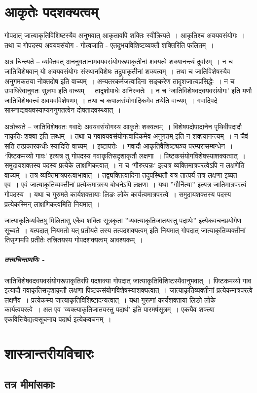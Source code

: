 \section{आकृतेः पदशक्यत्वम्} 
	
		गोपदात् जात्याकृतिविशिष्टस्यैव अनुभवात् आकृतावपि शक्तिः स्वीक्रियते~। आकृतिश्च अवयवसंयोगः~।  तथा च गोपदस्य अवयवसंयोग - गोत्वजाति - एतदुभयविशिष्टव्यक्तौ शक्तिरिति फलितम्~।
		
		अत्र चिन्त्यते – व्यक्तिवत् अननुगतानामवयवसंयोगरूपाकृतीनां शक्यत्वे शक्यानन्त्यं दुर्वारम्~। न च जातिविशेषवान् यो अवयवसंयोगः संस्थानविशेषः तद्रूपाकृतीनां शक्यत्वम्~। तथा च जातिविशेषस्यैव अनुगमकतया नोक्तदोष इति वाच्यम्~। अन्यतरकर्मजत्वादिना सङ्करेण तादृशजात्यप्रसिद्धेः~। न च उपाधिरेवानुगतः सुलभः इति वाच्यम्~। तादृशोपाधेः अनिरुक्तेः~। न च ‘जातिविशेषवदवयवसंयोगः’ इति मणौ जातिविशेषवत्त्वं अवयवविशेषणम्~। तथा च कपालसंयोगादिकमेव तथेति वाच्यम्~। गवादिपदे सास्नाद्यवयवस्याप्यननुगतत्वेन दोषतादवस्थ्यात्~। 

		अत्रोच्यते – जातिविशेषवतः गवादेः अवयवसंयोगस्य आकृतेः शक्यत्वम्~। विशेषपदोपादानेन पृथिवीपदादौ नाकृतिः शक्या इति लब्धम्~। तथा च गवावयवसंयोगत्वादिकमेव अनुगतम् इति न शक्त्यानन्त्यम्~। न चैवं सति तत्प्रकारकधीः स्यादिति वाच्यम्~। इष्टापत्तेः~। गवादौ आकृतिवैशिष्ट्यञ्च परम्परासम्बन्धेन~। ‘पिष्टकमय्यो गावः’ इत्यत्र तु गोपदस्य गवाकृतिसदृशाकृतौ लक्षणा~। पिष्टकसंयोगविशेषस्याशक्यत्वात्~। समुदायशक्तस्य पदस्य प्रत्येके लाक्षणिकत्वात्~। न च ‘गौरुत्पन्नः’ इत्यत्र व्यक्तिमात्रपरत्वेऽपि न लक्षणेति वाच्यम्~। तत्र व्यक्तिमात्रपरत्वाभावात्~। तद्व्यक्तित्वादिना तदुपस्थितौ यत्र तात्पर्यं तत्र लक्षणा इष्यत एव~।  एवं जात्याकृतिव्यक्तीनां प्रत्येकमात्रस्य बोधनेऽपि लक्षणा~।  यथा ”गौर्नित्या” इत्यत्र जातिमात्रपरत्वं गोपदस्य~।  यथा च गुरुमते कार्यशक्तायाः लिङः लोके  कार्यत्वमात्रपरत्वे~।  समुदायशक्तस्य पदस्य प्रत्येकस्मिन् लाक्षणिकत्वमिति नियमात्~। 

		जात्याकृतिव्यक्तिषु मिलितासु एकैव शक्तिः सूत्रकृता ”व्यक्त्याकृतिजातयस्तु पदार्थः” इत्येकवचनप्रयोगेण सूच्यते~।  यत्पदात् नियमतो यत् प्रतीयते तस्य तत्पदशक्यत्वम् इति नियमात् गोपदात् जात्याकृतिव्यक्तीनां तिसृणामपि प्रतीतेः तत्त्रितयस्य गोपदशक्यत्वम् आवश्यकम्~। 


		\subparagraph{तत्त्वचिन्तामणिः - }

			जातिविशेषवदवयवसंयोगरूपाकृतिरपि पदशक्या गोपदात् जात्याकृतिविशिष्टस्यैवानुभवात्~। पिष्टकमय्यो गाव इत्यादौ गवाकृतिसदृशाकृतौ लक्षणा पिष्टकसंयोगविशेषस्याशक्यत्वात्~। जात्याकृतिव्यक्तीनां प्रत्येकमात्रपरत्वे लक्षणैव~। प्रत्येकस्य जात्याकृतिविशिष्टादन्यत्वात्~। यथा गुरूणां कार्यशक्ताया लिङो लोके कार्यत्वपरत्वे~। अत एव ’व्यक्त्याकृतिजातयस्तु पदार्थ’ इति पारमर्षसूत्रम्~। एकयैव शक्त्या एकवित्तिवेद्यत्वसूचनाय पदार्थ इत्येकवचनम्~। 



\section{शास्त्रान्तरीयविचारः}

\subsection{तत्र मीमांसकाः} 
